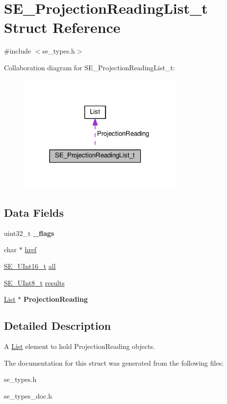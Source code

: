 \hypertarget{structSE__ProjectionReadingList__t}{}\section{S\+E\+\_\+\+Projection\+Reading\+List\+\_\+t Struct Reference}
\label{structSE__ProjectionReadingList__t}


{\ttfamily \#include $<$se\+\_\+types.\+h$>$}



Collaboration diagram for S\+E\+\_\+\+Projection\+Reading\+List\+\_\+t\+:\nopagebreak
\begin{figure}[H]
\begin{center}
\leavevmode
\includegraphics[width=233pt]{structSE__ProjectionReadingList__t__coll__graph}
\end{center}
\end{figure}
\subsection*{Data Fields}
\begin{DoxyCompactItemize}
\item 
uint32\+\_\+t {\bfseries \+\_\+flags}
\item 
char $\ast$ \hyperlink{group__ProjectionReadingList_gafbb9141bdf291e914094086570ba7eba}{href}
\item 
\hyperlink{group__UInt16_gac68d541f189538bfd30cfaa712d20d29}{S\+E\+\_\+\+U\+Int16\+\_\+t} \hyperlink{group__ProjectionReadingList_ga6eac100bf5814c2361a25d6ea3f5963f}{all}
\item 
\hyperlink{group__UInt8_gaf7c365a1acfe204e3a67c16ed44572f5}{S\+E\+\_\+\+U\+Int8\+\_\+t} \hyperlink{group__ProjectionReadingList_gaadc1fb88b20c64295f8edbd46da6d3ef}{results}
\item 
\hyperlink{structList}{List} $\ast$ {\bfseries Projection\+Reading}
\end{DoxyCompactItemize}


\subsection{Detailed Description}
A \hyperlink{structList}{List} element to hold Projection\+Reading objects. 

The documentation for this struct was generated from the following files\+:\begin{DoxyCompactItemize}
\item 
se\+\_\+types.\+h\item 
se\+\_\+types\+\_\+doc.\+h\end{DoxyCompactItemize}
